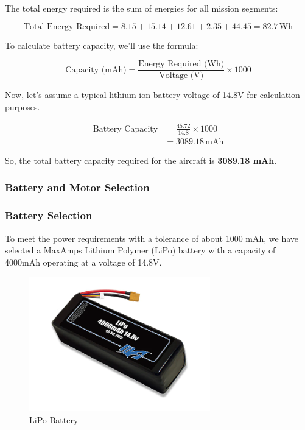 \documentclass[12 pt]{article}
\begin{document}
The total energy required is the sum of energies for all mission segments:

\[
\text{Total Energy Required} = 8.15 + 15.14 + 12.61 + 2.35 + 44.45 = 82.7 \, \text{Wh}
\]

To calculate battery capacity, we'll use the formula:

\[
\text{Capacity (mAh)} = \frac{\text{Energy Required (Wh)}}{\text{Voltage (V)}} \times 1000
\]


Now, let's assume a typical lithium-ion battery voltage of 14.8V for calculation purposes.

\begin{align}
\text{Battery Capacity} &= \frac{45.72}{14.8} \times 1000 \\
& = 3089.18 \, \text{mAh}
\end{align}

So, the total battery capacity required for the aircraft is \textbf{3089.18 mAh}.

\subsubsection{Battery and Motor Selection}

\subsubsection{Battery Selection}

To meet the power requirements with a tolerance of about 1000 mAh, we have selected a MaxAmps Lithium Polymer (LiPo) battery with a capacity of 4000mAh operating at a voltage of 14.8V.

\begin{figure}[h]
    \centering
    \includegraphics[width=0.7\textwidth]{LiPo-4000-4S-14.8v-Battery-Pack.jpg}
    \caption{LiPo Battery}
    \label{fig:battery}
\end{figure}
\end{document}
